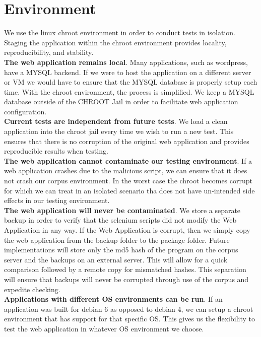 \documentclass[letterpaper,twocolumn,10pt]{article}
\begin{document}
\section{Environment}

We use the linux chroot environment in order to conduct tests in isolation.  Staging the application within the chroot environment provides locality, reproducibility, and stability.\\

{\bf The web application remains local}.  Many applications, such as wordpress, have a MYSQL backend.  If we were to host the application on a different server or VM we would have to ensure that the MYSQL database is properly setup each time.  With the chroot environment, the process is simplified. We keep a MYSQL database outside of the CHROOT Jail in order to facilitate web application configuration.  \\

{\bf Current tests are independent from future tests}.  We load a clean application into the chroot jail every time we wish to run a new test.  This ensures that there is no corruption of the original web application and provides reproducible results when testing.\\

{\bf The web application cannot contaminate our testing environment}.  If a web application crashes due to the malicious script, we can ensure that it does not crash our corpus environment.  In the worst case the chroot becomes corrupt for which we can treat in an isolated scenario tha does not have un-intended side effects in our testing environment.  \\

{\bf The web application will never be contaminated}.  We store a separate backup in order to verify that the selenium scripts did not modify the Web Application in any way.  If the Web Application is corrupt, then we simply copy the web application from the backup folder to the package folder.  Future implementations will store only the md5 hash of the program on the corpus server and the backups on an external server.  This will allow for a quick comparison followed by a remote copy for mismatched hashes.  This separation will ensure that backups will never be corrupted through use of the corpus and expedite checking.  \\

{\bf Applications with different OS environments can be run}.  If an application was built for debian 6 as opposed to debian 4, we can setup a chroot environment that has support for that specific OS.  This gives us the flexibility to test the web application in whatever OS environment we choose.
\end{document}
